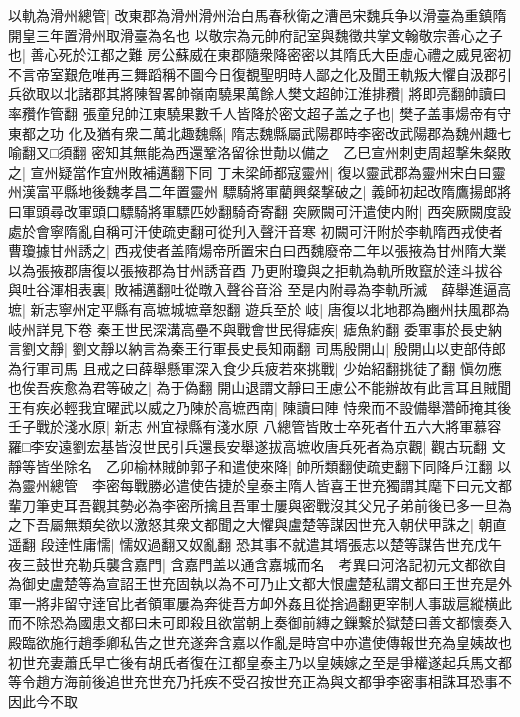 以軌為滑州總管|{
	改東郡為滑州滑州治白馬春秋衛之漕邑宋魏兵争以滑臺為重鎮隋開皇三年置滑州取滑臺為名也}
以敬宗為元帥府記室與魏徵共掌文翰敬宗善心之子也|{
	善心死於江都之難}
房公蘇威在東郡隨衆降密密以其隋氏大臣虛心禮之威見密初不言帝室艱危唯再三舞蹈稱不圖今日復覩聖明時人鄙之化及聞王軌叛大懼自汲郡引兵欲取以北諸郡其將陳智畧帥嶺南驍果萬餘人樊文超帥江淮排䂎|{
	將即亮翻帥讀曰率䂎作管翻}
張童兒帥江東驍果數千人皆降於密文超子盖之子也|{
	樊子盖事煬帝有守東都之功}
化及猶有衆二萬北趣魏縣|{
	隋志魏縣屬武陽郡時李密改武陽郡為魏州趣七喻翻又□須翻}
密知其無能為西還鞏洛留徐世勣以備之　乙巳宣州刺吏周超撃朱粲敗之|{
	宣州疑當作宜州敗補邁翻下同}
丁未梁師都寇靈州|{
	復以靈武郡為靈州宋白曰靈州漢富平縣地後魏孝昌二年置靈州}
驃騎將軍藺興粲撃破之|{
	義師初起改隋鷹揚郎將曰軍頭尋改軍頭口驃騎將軍驃匹妙翻騎奇寄翻}
突厥闕可汗遣使内附|{
	西突厥闕度設處於會寧隋亂自稱可汗使疏吏翻可從刋入聲汗音寒}
初闕可汗附於李軌隋西戎使者曹瓊據甘州誘之|{
	西戎使者盖隋煬帝所置宋白曰西魏廢帝二年以張掖為甘州隋大業以為張掖郡唐復以張掖郡為甘州誘音酉}
乃更附瓊與之拒軌為軌所敗竄於逹斗拔谷與吐谷渾相表裏|{
	敗補邁翻吐從暾入聲谷音浴}
至是内附尋為李軌所滅　薛舉進逼高墌|{
	新志寧州定平縣有高墌城墌章恕翻}
遊兵至於岐|{
	唐復以北地郡為豳州扶風郡為岐州詳見下卷}
秦王世民深溝高壘不與戰會世民得瘧疾|{
	瘧魚約翻}
委軍事於長史納言劉文靜|{
	劉文靜以納言為秦王行軍長史長知兩翻}
司馬殷開山|{
	殷開山以吏部侍郎為行軍司馬}
且戒之曰薛舉懸軍深入食少兵疲若來挑戰|{
	少始紹翻挑徒了翻}
愼勿應也俟吾疾愈為君等破之|{
	為于偽翻}
開山退謂文靜曰王慮公不能辦故有此言耳且賊聞王有疾必輕我宜曜武以威之乃陳於高墌西南|{
	陳讀曰陣}
恃衆而不設備舉濳師掩其後壬子戰於淺水原|{
	新志州宜禄縣有淺水原}
八總管皆敗士卒死者什五六大將軍慕容羅□李安遠劉宏基皆沒世民引兵還長安舉遂拔高墌收唐兵死者為京觀|{
	觀古玩翻}
文靜等皆坐除名　乙卯榆林賊帥郭子和遣使來降|{
	帥所類翻使疏吏翻下同降戶江翻}
以為靈州總管　李密每戰勝必遣使告捷於皇泰主隋人皆喜王世充獨謂其麾下曰元文都輩刀筆吏耳吾觀其勢必為李密所擒且吾軍士屢與密戰沒其父兄子弟前後已多一旦為之下吾屬無類矣欲以激怒其衆文都聞之大懼與盧楚等謀因世充入朝伏甲誅之|{
	朝直遥翻}
段逹性庸懦|{
	懦奴過翻又奴亂翻}
恐其事不就遣其壻張志以楚等謀告世充戊午夜三鼓世充勒兵襲含嘉門|{
	含嘉門盖以通含嘉城而名　考異曰河洛記初元文都欲自為御史盧楚等為宣詔王世充固執以為不可乃止文都大恨盧楚私謂文都曰王世充是外軍一將非留守逹官比者領軍屢為奔徙吾方卹外姦且從捨過翻更宰制人事跋扈縱横此而不除恐為國患文都曰未可即殺且欲當朝上奏御前縳之鏁繋於獄楚曰善文都懷奏入殿臨欲施行趙季卿私告之世充遂奔含嘉以作亂是時宫中亦遣使傳報世充為皇姨故也初世充妻蕭氏早亡後有胡氏者復在江都皇泰主乃以皇姨嫁之至是爭權遂起兵馬文都等令趙方海前後追世充世充乃托疾不受召按世充正為與文都爭李密事相誅耳恐事不因此今不取}
